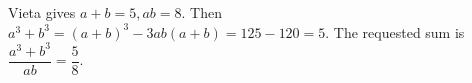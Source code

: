 Vieta gives $a+b=5,ab=8$. Then $a^3+b^3=(a+b)^3-3ab(a+b)=125-120=5$. The requested sum is $\dfrac{a^3+b^3}{ab}=\boxed{\dfrac{5}{8}}$.
